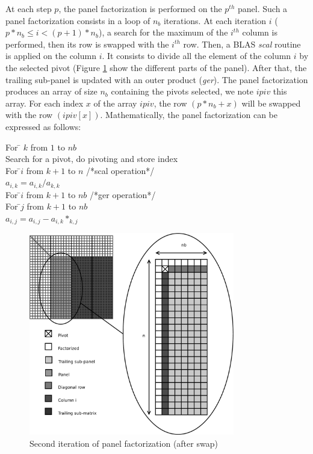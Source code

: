  
At each step $p$, the panel factorization is performed on the $p^{th}$ panel. Such a panel factorization consists in a loop of $n_b$ iterations. At each iteration $i$ ($p*n_b \leq i < (p+1)*n_b$), a search for the maximum of the $i^{th}$ column is performed, then its row is swapped with the $i^{th}$ row.
Then, a BLAS \textit{scal} routine is applied on the column $i$. It consists to divide all the element of the column $i$ by the selected pivot (Figure \ref{fig:panel} show the different parts of the panel).
After that, the trailing sub-panel is updated with an outer product (\textit{ger}). The panel factorization produces an array of size $n_b$ containing the pivots selected, we note $ipiv$ this array. For each index $x$ of the array $ipiv$, the row $(p*n_b + x)$ will be swapped with the row $(ipiv[x])$.
Mathematically, the panel factorization can be expressed as follows:\\
\begin{tabbing}
For \= $k$ from $1$ to $nb$\\
\> Search for a pivot, do pivoting and store index\\
\> For \=$i$ from $k+1$ to $n$    /*scal operation*/\\
\>\> $a_{i,k} = a_{i,k}/a_{k,k}$\\
\> For \=$i$ from $k+1$ to $nb$   /*ger operation*/\\
\>\> For \=$j$ from $k+1$ to $nb$\\
\>\>\> $a_{i,j} = a_{i,j}-a_{i,k}*_{k,j}$\\
\end{tabbing}

\begin{figure}[!ht]
\centering
\includegraphics[width=0.8\textwidth]{figures/panel.pdf}
\caption{Second iteration of panel factorization (after swap)\label{fig:panel}}
\end{figure}

